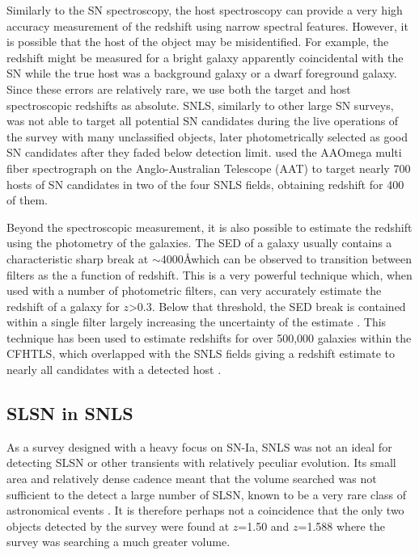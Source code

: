 Similarly to the SN spectroscopy, the host spectroscopy can provide a very high accuracy measurement of the redshift using narrow spectral features. However, it is possible that the host of the object may be misidentified. For example, the redshift might be measured for a bright galaxy apparently coincidental with the SN while the true host was a background galaxy or a dwarf foreground galaxy. Since these errors are relatively rare, we use both the target and host spectroscopic redshifts as absolute. SNLS, similarly to other large SN surveys, was not able to target all potential SN candidates during the live operations of the survey with many unclassified objects, later photometrically selected as good SN candidates after they faded below detection limit. \citet{Lidman2012} used the AAOmega multi fiber spectrograph on the Anglo-Australian Telescope (AAT) to target nearly 700 hosts of SN candidates in two of the four SNLS fields, obtaining redshift for 400 of them.

Beyond the spectroscopic measurement, it is also possible to estimate the redshift using the photometry of the galaxies. The SED of a galaxy usually contains a characteristic sharp break at $\sim$4000\AA which can be observed to transition between filters as the a function of redshift. This is a very powerful technique which, when used with a number of photometric filters, can very accurately estimate the redshift of a galaxy for $z$>0.3. Below that threshold, the SED break is contained within a single filter largely increasing the uncertainty of the estimate \citep{Connolly1995}. This technique has been used to estimate redshifts for over 500,000 galaxies within the CFHTLS, which overlapped with the SNLS fields giving a redshift estimate to nearly all candidates with a detected host \citep{Ilbert2006}.

\subsection{SLSN in SNLS}
As a survey designed with a heavy focus on SN-Ia, SNLS was not an ideal for detecting SLSN or other transients with relatively peculiar evolution. Its small area and relatively dense cadence meant that the volume searched was not sufficient to the detect a large number of SLSN, known to be a very rare class of astronomical events \citep{Cooke2012,Prajs2016,Quimby2013}. It is therefore perhaps not a coincidence that the only two objects detected by the survey were found at $z$=1.50 and $z$=1.588 where the survey was searching a much greater volume.

